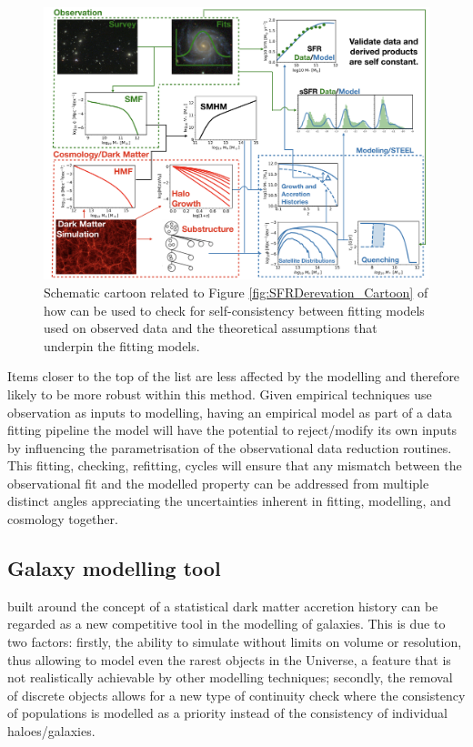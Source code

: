 \begin{figure}[t]
    \centering
    \includegraphics[width = \linewidth]{Figures/Chapter6/FullModelCartoon.png}
    \caption{Schematic cartoon related to Figure \ref{fig:SFRDerevation_Cartoon} of how \steel can be used to check for self-consistency between fitting models used on observed data and the theoretical assumptions that underpin the fitting models.}
    \label{fig:Full_Mod_Toon}
\end{figure}
Items closer to the top of the list are less affected by the modelling and therefore likely to be more robust within this method. Given empirical techniques use observation as inputs to modelling, having an empirical model as part of a data fitting pipeline the model will have the potential to reject/modify its own inputs by influencing the parametrisation of the observational data reduction routines. This fitting, checking, refitting, cycles will ensure that any mismatch between the observational fit and the modelled property can be addressed from multiple distinct angles appreciating the uncertainties inherent in fitting, modelling, and cosmology together.

\subsection{Galaxy modelling tool}

\steel built around the concept of a statistical dark matter accretion history can be regarded as a new competitive tool in the modelling of galaxies. This is due to two factors: firstly, the ability to simulate without limits on volume or resolution, thus allowing to model even the rarest objects in the Universe, a feature that is not realistically achievable by other modelling techniques; secondly, the removal of discrete objects allows for a new type of continuity check where the consistency of populations is modelled as a priority instead of the consistency of individual haloes/galaxies. 

